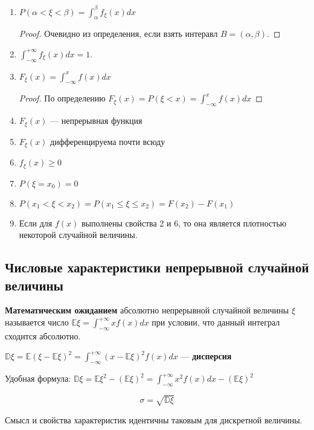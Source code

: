 \begin{prop}\itemfix
    \begin{enumerate}
        \item \(P(\alpha < \xi < \beta) = \int_\alpha^\beta f_\xi(x) dx\)
              \begin{proof}
                  Очевидно из определения, если взять интеравл \(B = (\alpha, \beta)\).
              \end{proof}

        \item \(\int_{ -\infty}^{+\infty} f_\xi(x)dx = 1\).
        \item \(F_\xi(x) = \int_{ - \infty}^x f(x) dx\)
              \begin{proof}
                  По определению \(F_\xi(x) = P(\xi < x) = \int_{ -\infty}^x f(x) dx\)
              \end{proof}
        \item \(F_\xi(x)\) --- непрерывная функция
        \item \(F_\xi(x)\) дифференцируема почти всюду
        \item \(f_\xi(x) \geq 0\)
        \item \(P(\xi = x_0) = 0\)
        \item \(P(x_1 < \xi < x_2) = P(x_1 \leq \xi \leq x_2) = F(x_2) - F(x_1)\)
        \item Если для \(f(x)\) выполнены свойства 2 и 6, то она является плотностью некоторой случайной величины.
    \end{enumerate}
\end{prop}

\subsection{Числовые характеристики непрерывной случайной величины}

\begin{definition}
    \textbf{Математическим ожиданием} абсолютно непрерывной случайной величины \(\xi\) называется число \(\mathbb{E}\xi = \int_{ -\infty}^{+\infty} x f(x) dx\) при условии, что данный интеграл сходится абсолютно.
\end{definition}

\begin{definition}
    \(\mathbb{D}\xi = \mathbb{E}(\xi - \mathbb{E}\xi)^2 = \int_{ -\infty}^{+\infty} (x - \mathbb{E}\xi)^2 f(x) dx\) --- \textbf{дисперсия}
\end{definition}

\begin{remark}
    Удобная формула: \(\mathbb{D}\xi = \mathbb{E}\xi^2 - (\mathbb{E}\xi)^2 = \int_{ -\infty}^{+\infty} x^2 f(x) dx - (\mathbb{E}\xi)^2\)
\end{remark}

\[\sigma = \sqrt{\mathbb{D}\xi}\]

\begin{remark}
    Смысл и свойства характеристик идентичны таковым для дискретной величины.
\end{remark}